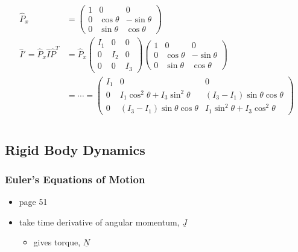 \documentclass[a4paper,11pt,normalem]{article}
\begin{document}
\[
    \begin{aligned}
    \hat{P}_x &= \begin{pmatrix} 1 & 0 & 0 \\ 0 & \cos\theta & -\sin\theta \\ 0 & \sin\theta & \cos\theta \end{pmatrix} \\
    \hat{I}' = \hat{P}_x \hat{I} \hat{P}^T &= \hat{P}_x \begin{pmatrix} I_1 & 0 & 0 \\ 0 & I_2 & 0 \\ 0 & 0 & I_3 \end{pmatrix} \begin{pmatrix} 1 & 0 & 0 \\ 0 & \cos\theta & -\sin\theta \\ 0 & \sin\theta & \cos\theta \end{pmatrix} \\
    &= \cdots = \begin{pmatrix} I_1 & 0 & 0 \\ 0 & I_1\cos^2\theta + I_3\sin^2\theta & (I_3 - I_1)\sin\theta\cos\theta \\ 0 & (I_3 - I_1)\sin\theta\cos\theta & I_1\sin^2\theta + I_3\cos^2\theta \end{pmatrix}
    \end{aligned}
\]

\section{}\label{lecture-19}

\subsection{Rigid Body Dynamics}\label{rigid-body-dynamics}

\subsubsection{Euler's Equations of Motion}\label{eulers-equations-of-motion}

\begin{itemize}
\item
  page 51
\item
  take time derivative of angular momentum, \(\underline{J}\)
  \begin{itemize}
  \item
    gives torque, \(\underline{N}\)
  \end{itemize}
\end{itemize}
\end{document}
